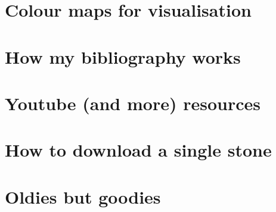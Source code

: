 \section{Colour maps for visualisation}  %
\section{How my bibliography works}  %
\section{Youtube (and more) resources}  %
\section{How to download a single stone}  %
\section{Oldies but goodies}  %
